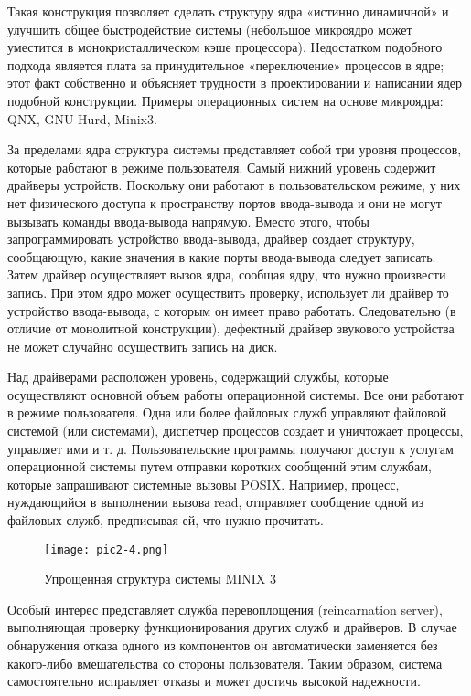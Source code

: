 Такая конструкция позволяет сделать структуру ядра «истинно динамичной» и улучшить общее быстродействие системы (небольшое микроядро может уместится в монокристаллическом кэше процессора). Недостатком подобного подхода является плата за принудительное «переключение» процессов в ядре; этот факт собственно и объясняет трудности в проектировании и написании ядер подобной конструкции. Примеры операционных систем на основе микроядра: QNX, GNU Hurd, Minix3.

За пределами ядра структура системы представляет собой три уровня процессов, которые работают в режиме пользователя. Самый нижний уровень содержит драйверы устройств. Поскольку они работают в пользовательском режиме, у них нет физического доступа к пространству портов ввода-вывода и они не могут вызывать команды ввода-вывода напрямую. Вместо этого, чтобы запрограммировать устройство ввода-вывода, драйвер создает структуру, сообщающую, какие значения в какие порты ввода-вывода следует записать. Затем драйвер осуществляет вызов ядра, сообщая ядру, что нужно произвести запись. При этом ядро может осуществить проверку, использует ли драйвер то устройство ввода-вывода, с которым он имеет право работать. Следовательно (в отличие от монолитной конструкции), дефектный драйвер звукового устройства не может случайно осуществить запись на диск.

Над драйверами расположен уровень, содержащий службы, которые осуществляют основной объем работы операционной системы. Все они работают в режиме пользователя. Одна или более файловых служб управляют файловой системой (или системами), диспетчер процессов создает и уничтожает процессы, управляет ими и т. д. Пользовательские программы получают доступ к услугам операционной системы путем отправки коротких сообщений этим службам, которые запрашивают системные вызовы POSIX. Например, процесс, нуждающийся в выполнении вызова read, отправляет сообщение одной из файловых служб, предписывая ей, что нужно прочитать.

\begin{figure}\center
   \texttt{[image: pic2-4.png]}
   \caption{Упрощенная структура системы MINIX 3}
\end{figure}

Особый интерес представляет служба перевоплощения (reincarnation server), выполняющая проверку функционирования других служб и драйверов. В случае обнаружения отказа одного из компонентов он автоматически заменяется без какого-либо вмешательства со стороны пользователя. Таким образом, система самостоятельно исправляет отказы и может достичь высокой надежности.
\newline

